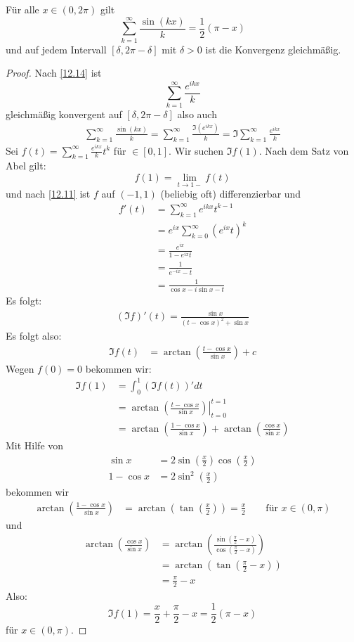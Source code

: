\documentclass[a4paper,10pt]{scrartcl}
\begin{document}
\begin{st}
\label{12.15}
Für alle $x\in(0,2\pi)$ gilt
\[
\sum_{k=1}^\infty \frac{\sin(kx)}k = \frac 12 (\pi-x)
\]
und auf jedem Intervall $[\delta,2\pi-\delta]$ mit $\delta>0$ ist die Konvergenz gleichmäßig.

\begin{proof}
Nach \ref{12.14} ist
\[
\sum_{k=1}^\infty \frac {e^{ikx}}k
\]
gleichmäßig konvergent auf $[\delta, 2\pi-\delta]$ also auch
\begin{align*}
\sum_{k=1}^\infty \frac{\sin(kx)}k
= \sum_{k=1}^\infty \frac {\Im(e^{ikx})}k
=\Im \sum_{k=1}^\infty \frac{e^{ikx}}k
\end{align*}
Sei $f(t) = \sum_{k=1}^\infty \frac{e^{ikx}}k t^k$ für $\in[0,1]$.
Wir suchen $\Im f(1)$.
Nach dem Satz von Abel gilt:
\[
f(1)=\lim_{t\to 1-}f(t)
\]
und nach \ref{12.11} ist $f$ auf $(-1,1)$ (beliebig oft) differenzierbar und
\begin{align*}
f'(t) 
&= \sum_{k=1}^\infty e^{ikx}t^{k-1}\\
&= e^{ix}\sum_{k=0}^\infty (e^{ix}t)^k\\
&= \frac {e^{ix}}{1-e^{ix}t}\\
&= \frac 1{e^{-ix}-t}\\
&= \frac 1{\cos x -i\sin x -t}
\end{align*}
Es folgt:
\begin{align*}
(\Im f)'(t)=\frac {\sin x}{(t-\cos x)^2 +\sin x}
\end{align*}
Es folgt also:
\begin{align*}
\Im f(t)
&= \arctan \left(\frac {t-\cos x}{\sin x}\right) + c
\end{align*}
Wegen $f(0)=0$ bekommen wir:
\begin{align*}
\Im f(1)
&= \int_0^1(\Im f(t))'dt\\
&= \left.\arctan\left( \frac {t-\cos x}{\sin x}\right)\right|_{t=0}^{t=1}\\
&= \arctan \left(\frac {1-\cos x}{\sin x}\right) +\arctan\left(\frac {\cos x}{\sin x}\right)
\end{align*}
Mit Hilfe von
\begin{align*}
\sin x &= 2\sin\left(\frac x2\right)\cos\left(\frac x2\right)\\
1-\cos x &= 2\sin^2\left(\frac x2\right)
\end{align*}
bekommen wir
\begin{align*}
\arctan\left(\frac {1-\cos x}{\sin x}\right)
&= \arctan\left(\tan\left(\frac x2\right)\right)
= \frac x2 \qquad \text{für } x\in (0,\pi)
\end{align*}
und
\begin{align*}
\arctan\left(\frac{\cos x}{\sin x}\right)
&= \arctan\left(\frac{\sin(\frac \pi2-x)}{\cos(\frac \pi2-x)}\right) \\
&= \arctan\left(\tan\left(\frac \pi 2-x\right)\right)\\
&= \frac \pi 2 -x
\end{align*}
Also:
\[
\Im f(1) = \frac x2 +\frac \pi 2- x= \frac 12 (\pi -x)
\]
für $x\in (0,\pi)$.
\end{proof}
\end{st}
\end{document}
